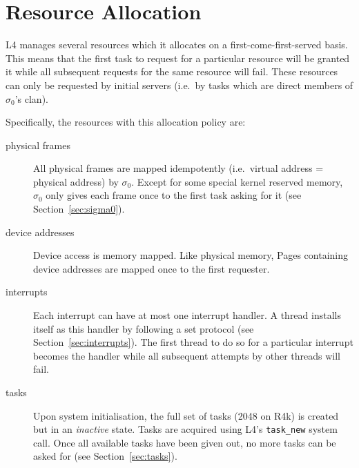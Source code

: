 
\section{Resource Allocation}


\label{sec:ralloc}

L4 manages several resources which it allocates on a
first-come-first-served basis. This means that the first task to
request for a particular resource will be granted it while all
subsequent requests for the same resource will fail. These resources
can only be requested by initial servers (i.e.\ by tasks which are
direct members of \(\sigma_0\)'s clan).

Specifically, the resources with this allocation policy are:

\begin{description}

\item[physical frames] All physical frames are mapped idempotently
  (i.e.\ virtual address = physical address) by $\sigma_0$. Except for
  some special kernel reserved memory, $\sigma_0$ only gives each
  frame once to the first task asking for it (see
  Section~\ref{sec:sigma0}).

\item[device addresses] Device access is memory mapped. Like physical
  memory, Pages containing device addresses are mapped once to the
  first requester.

\item[interrupts] Each interrupt can have at most one interrupt
  handler. A thread installs itself as this handler by following a set
  protocol (see Section~\ref{sec:interrupts}). The first thread to do
  so for a particular interrupt becomes the handler while all
  subsequent attempts by other threads will fail.

\item[tasks] Upon system initialisation, the full set of tasks (2048
  on R4k) is created but in an \emph{inactive} state. Tasks are
  acquired using L4's {\footnotesize\verb+task_new+} system call. Once all available
  tasks have been given out, no more tasks can be asked for (see
  Section~\ref{sec:tasks}).

\end{description}


